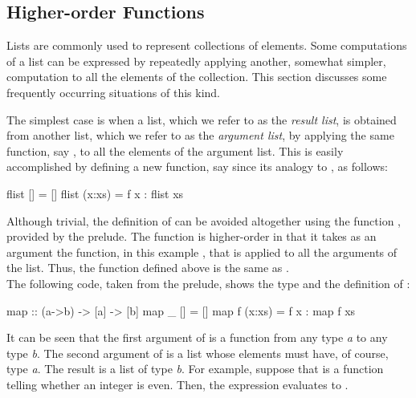 \subsection{Higher-order Functions}
\label{ho-list-functions}

Lists are commonly used to represent collections of elements.
Some computations of a list can be expressed by repeatedly
applying another, somewhat simpler, computation
to all the elements of the collection.
This section discusses some frequently occurring situations
of this kind.

The simplest case is when a list, which we refer to as the
\emph{result list}, is obtained from another list,
which we refer to as the \emph{argument list}, by applying
the same function, say , to all the elements of the argument list.
This is easily accomplished by defining a new function, say
 since its analogy to , as follows:
%
\begin{prog}
flist [] = []
flist (x:xs) = f x : flist xs
\end{prog}
%
Although trivial, the definition of  can be
avoided altogether using the function ,
provided by the prelude.
The function  is higher-order in that it takes
as an argument the function, in this example ,
that is applied to all the arguments of the list.
Thus, the function  defined above
is the same as .
\\[1ex]
The following code, taken from the prelude, shows
the type and the definition of :
%
\begin{prog}
map          :: (a->b) -> [a] -> [b]
map _ []     = []
map f (x:xs) = f x : map f xs
\end{prog}
%
It can be seen that the first argument of 
is a function from any type \emph{a} to any type \emph{b}.
The second argument of  is a list whose elements
must have, of course, type \emph{a}.
The result is a list of type \emph{b}.
For example, suppose that  is a function
telling whether an integer is even.
Then, the expression 
evaluates to .

